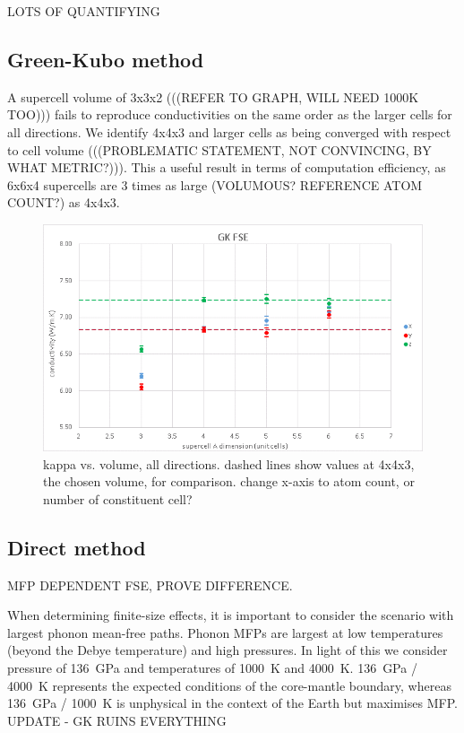 \documentclass[%
preprint,                                  %
nofootinbib,
 amsmath,amssymb,
 aps,
]{revtex4-1}
\begin{document}
LOTS OF QUANTIFYING

\subsection{\label{sec:results.gk}Green-Kubo method}

A supercell volume of 3x3x2 (((REFER TO GRAPH, WILL NEED 1000K TOO))) fails to reproduce conductivities on the same order as the larger cells for all directions. We identify 4x4x3 and larger cells as being converged with respect to cell volume (((PROBLEMATIC STATEMENT, NOT CONVINCING, BY WHAT METRIC?))). This a useful result in terms of computation efficiency, as 6x6x4 supercells are 3 times as large (VOLUMOUS? REFERENCE ATOM COUNT?) as 4x4x3.

\begin{figure}[h!]
  \includegraphics[width=\linewidth]{images/gk_fse_draft.png}
  \caption{kappa vs. volume, all directions. dashed lines show values at 4x4x3, the chosen volume, for comparison. change x-axis to atom count, or number of constituent cell?}
  \label{fig:gk_fse}
\end{figure}








\subsection{\label{sec:results.direct}Direct method}

MFP DEPENDENT FSE, PROVE DIFFERENCE. 

When determining finite-size effects, it is important to consider the scenario with largest phonon mean-free paths. Phonon MFPs are largest at low temperatures (beyond the Debye temperature) and high pressures. In light of this we consider pressure of 136~GPa and temperatures of 1000~K and 4000~K. 136~GPa / 4000~K represents the expected conditions of the core-mantle boundary, whereas 136~GPa / 1000~K is unphysical in the context of the Earth but maximises MFP.  UPDATE - GK RUINS EVERYTHING
\end{document}
